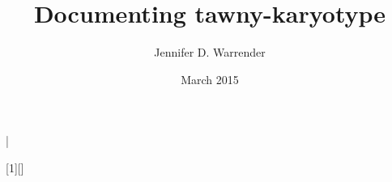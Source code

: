 \documentclass{book}
\begin{document}
\lstMakeShortInline[style=kstyle]|

[1][]%
{\lstset{style=kstyle,frame=shadowbox,#1}}{}

\title{Documenting tawny-karyotype}

\author{Jennifer D. Warrender}

\date{March 2015}

\maketitle
















\end{document}
